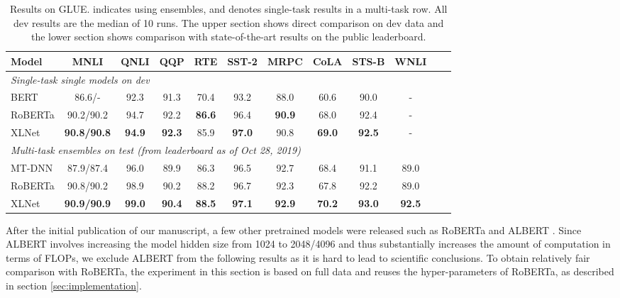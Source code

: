 \documentclass{article}
\begin{document}
\begin{table}[!h]
  \small
  \centering
  
  \begin{tabular}{lccccccccccc}
    \toprule
    \bf Model & \bf MNLI & \bf QNLI & \bf QQP & \bf RTE & \bf SST-2 & \bf MRPC & \bf CoLA & \bf STS-B & \bf WNLI \\
    \midrule
    \multicolumn{8}{l}{\it Single-task single models on dev} \\
    BERT \cite{anonymous2018bam} & 86.6/- & 92.3 & 91.3 & 70.4 & 93.2 & 88.0 & 60.6 & 90.0 & - \\
    RoBERTa \cite{liu2019roberta} & 90.2/90.2 & 94.7 & 92.2 & \bf 86.6 & 96.4 & \bf 90.9 & 68.0 & 92.4 & - \\
    XLNet & \bf 90.8/90.8 & \bf 94.9 & \bf 92.3 & 85.9 & \bf 97.0 & 90.8 & \bf 69.0 & \bf 92.5 & - \\ \midrule
\multicolumn{8}{l}{\it Multi-task ensembles on test (from leaderboard as of Oct 28, 2019)} \\
MT-DNN \cite{liu2019multi} & 87.9/87.4 & 96.0 & 89.9 & 86.3 & 96.5 & 92.7 & 68.4 & 91.1 & 89.0 \\
    RoBERTa \cite{liu2019roberta} & 90.8/90.2 & 98.9 & 90.2 & 88.2 & 96.7 & 92.3 & 67.8 & 92.2 & 89.0 \\
    XLNet & \bf 90.9/90.9 & \bf 99.0 & \bf 90.4 & \bf 88.5 & \bf 97.1 & \bf 92.9 & \bf 70.2 & \bf 93.0 & \bf 92.5 \\
    \bottomrule
  \end{tabular}
  \caption{\small
    Results on GLUE.  indicates using ensembles, and  denotes single-task results in a multi-task row. All dev results are the median of 10 runs. The upper section shows direct comparison on dev data and the lower section shows comparison with state-of-the-art results on the public leaderboard.
  }
  \label{tab:sota-glue}
\end{table}





After the initial publication of our manuscript, a few other pretrained models were released such as RoBERTa \cite{liu2019roberta} and ALBERT \cite{lan2019albert}. Since ALBERT involves increasing the model hidden size from 1024 to 2048/4096 and thus substantially increases the amount of computation in terms of FLOPs, we exclude ALBERT from the following results as it is hard to lead to scientific conclusions. 
To obtain relatively fair comparison with RoBERTa, the experiment in this section is based on full data and reuses the hyper-parameters of RoBERTa, as described in section \ref{sec:implementation}.
\end{document}
